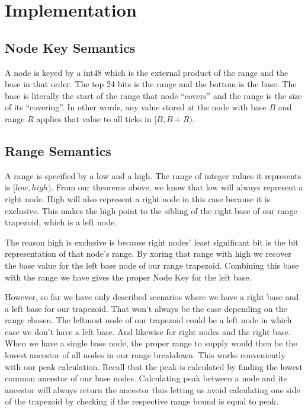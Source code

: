 \documentclass{article}
\begin{document}
\section{Implementation}

\subsection{Node Key Semantics}

A node is keyed by a int48 which is the external product of the range and the
base in that order. The top 24 bits is the range and the bottom is the base.
The base is literally the start of the range that node ``covers'' and the range
is the size of its ``covering''. In other words, any value stored at the node
with base $B$ and range $R$ applies that value to all ticks in $[B, B+R)$.

\subsection{Range Semantics}

A range is specified by a low and a high. The range of integer values it
represents is $[low, high)$. From our theorems above, we know that low will
always represent a right node. High will also represent a right node in this
case because it is exclusive. This makes the high point to the sibling of the
right base of our range trapezoid, which is a left node.

The reason high is exclusive is because right nodes' least significant
bit is the bit representation of that node's range. By xoring that range with
high we recover the base value for the left base node of our range trapezoid.
Combining this base with the range we have gives the proper Node Key for the
left base.

However, so far we have only described scenarios where we have a right base and
a left base for our trapezoid. That won't always be the case depending on the
range chosen. The leftmost node of our trapezoid could be a left node in which
case we don't have a left base. And likewise for right nodes and the right base.
When we have a single base node, the proper range to supply would then be the
lowest ancestor of all nodes in our range breakdown. This works conveniently
with our peak calculation. Recall that the peak is calculated by finding the
lowest common ancestor of our base nodes. Calculating peak between a node and
its ancestor will always return the ancestor thus letting us avoid calculating
one side of the trapezoid by checking if the respective range bound is equal to
peak.
\end{document}
